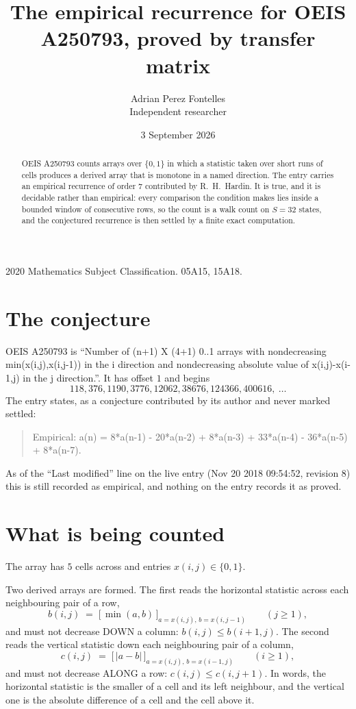\documentclass[11pt,a4paper]{article}
\title{The empirical recurrence for OEIS A250793, proved by transfer matrix}
\author{Adrian Perez Fontelles\\ \small Independent researcher}
\date{3 September 2026}
\theoremstyle{plain}
\theoremstyle{definition}
\begin{document}
\maketitle

\begin{abstract}
OEIS A250793 counts arrays over $\{0,1\}$ in which a statistic taken over short runs
of cells produces a derived array that is monotone in a named direction. The entry carries an
empirical recurrence of order $7$ contributed by R.~H.~Hardin. It is true, and it is
decidable rather than empirical: every comparison the condition makes lies inside a bounded
window of consecutive rows, so the count is a walk count on $S=32$ states, and the
conjectured recurrence is then settled by a finite exact computation.
\end{abstract}

\noindent\small 2020 Mathematics Subject Classification. 05A15, 15A18.\normalsize

\section{The conjecture}

OEIS A250793 is ``Number of (n+1) X (4+1) 0..1 arrays with nondecreasing min(x(i,j),x(i,j-1)) in the i direction and nondecreasing absolute value of x(i,j)-x(i-1,j) in the j direction.''. It has offset $1$ and begins
\[
118, 376, 1190, 3776, 12062, 38676, 124366, 400616,\ \dots
\]
The entry states, as a conjecture contributed by its author and never marked settled:
\begin{quote}
Empirical: a(n) = 8*a(n-1) - 20*a(n-2) + 8*a(n-3) + 33*a(n-4) - 36*a(n-5) + 8*a(n-7).
\end{quote}
As of the ``Last modified'' line on the live entry (Nov 20 2018 09:54:52, revision 8) this is still
recorded as empirical, and nothing on the entry records it as proved.

\section{What is being counted}

The array has $5$ cells across and entries $x(i,j)\in\{0,1\}$.

Two derived arrays are formed. The first reads the horizontal statistic across each
neighbouring pair of a row,
\[
b(i,j)\;=\;\bigl[\,\min(a,b)\,\bigr]_{a=x(i,j),\,b=x(i,j-1)}\qquad (j\ge1),
\]
and must not decrease DOWN a column: $b(i,j)\le b(i{+}1,j)$. The second reads the vertical
statistic down each neighbouring pair of a column,
\[
c(i,j)\;=\;\bigl[\,\lvert a-b\rvert\,\bigr]_{a=x(i,j),\,b=x(i{-}1,j)}\qquad (i\ge1),
\]
and must not decrease ALONG a row: $c(i,j)\le c(i,j{+}1)$. In words, the horizontal statistic
is the smaller of a cell and its left neighbour, and the vertical one is
the absolute difference of a cell and the cell above it.
\end{document}
